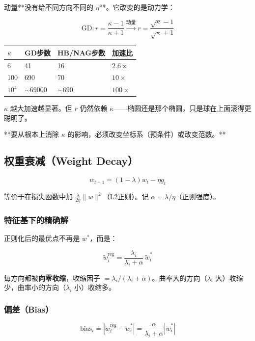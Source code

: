 \documentclass[12pt,a4paper]{article}
\begin{document}
动量**没有给不同方向不同的 $\eta$**。它改变的是动力学：


\[\text{GD}: r = \frac{\kappa-1}{\kappa+1} \xrightarrow{\text{动量}} r = \frac{\sqrt\kappa-1}{\sqrt\kappa+1}\]






\begin{center}\small
\begin{longtable}{|l|l|l|l|}
\hline
$\kappa$ & GD步数 & HB/NAG步数 & 加速比 \\
\hline
6 & 41 & 16 & $2.6\times$ \\
100 & 690 & 70 & $10\times$ \\
$10^4$ & $\sim 69000$ & $\sim 690$ & $100\times$ \\
\hline
\end{longtable}
\end{center}


$\kappa$ 越大加速越显著。但 $r$ 仍然依赖 $\kappa$——椭圆还是那个椭圆，只是球在上面滚得更聪明了。

**要从根本上消除 $\kappa$ 的影响，必须改变坐标系（预条件）或改变范数。**


\subsection{权重衰减（Weight Decay）}

\[w_{t+1} = (1 - \lambda)w_t - \eta g_t\]

等价于在损失函数中加 $\frac{\lambda}{2\eta}\|w\|^2$（L2正则）。记 $\alpha = \lambda/\eta$（正则强度）。

\subsubsection{特征基下的精确解}

正则化后的最优点不再是 $w^*$，而是：

\[\tilde{w}^{\text{reg}}_i = \frac{\lambda_i}{\lambda_i + \alpha}\,\tilde{w}^*_i\]

每方向都被\textbf{向零收缩}，收缩因子 $= \lambda_i/(\lambda_i + \alpha)$。曲率大的方向（$\lambda_i$ 大）收缩少，曲率小的方向（$\lambda_i$ 小）收缩多。

\subsubsection{偏差（Bias）}

\[\text{bias}_i = |\tilde{w}^{\text{reg}}_i - \tilde{w}^*_i| = \frac{\alpha}{\lambda_i + \alpha}|\tilde{w}^*_i|\]
\end{document}

